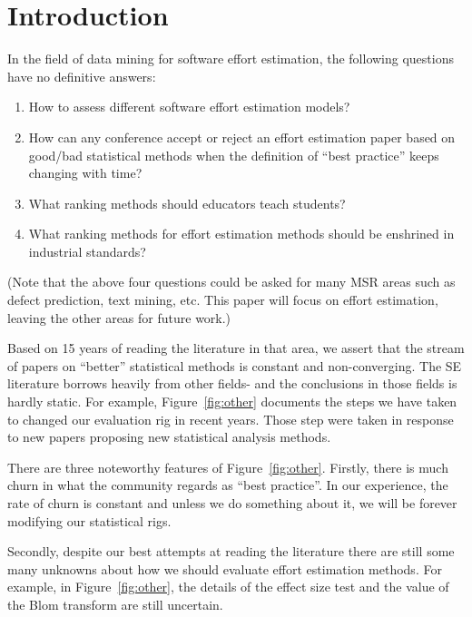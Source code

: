 \documentclass{sig-alternate}
\newcommand{\be}{\begin{enumerate}}
\newcommand{\ee}{\end{enumerate}}
\newcommand{\fig}[1]{Figure~\ref{fig:#1}}
\begin{document}
\section{Introduction}
\noindent
In the field of data mining for software effort estimation,
the following questions
have no definitive answers:
\be
\item
How to assess different software effort estimation
models?
\item  
 How can any conference accept or reject an
effort estimation paper based
on good/bad statistical methods when the
definition of  ``best
practice'' keeps changing with time? 
\item
What ranking methods
should educators teach  students?
\item
What ranking methods for effort estimation methods
should be enshrined in industrial standards? 
\ee
(Note that the above four questions could
be asked for many MSR areas such as defect prediction,
text mining, etc. This paper will
focus
on effort estimation, leaving the
other areas for future work.)

Based on 15 years of reading the literature
in that area, we assert that the stream of papers on
``better'' statistical methods is constant and
non-converging.  The SE literature
borrows heavily from other fields- and the
conclusions in those fields is hardly static.
For example, \fig{other} documents the
steps we have taken to
changed our evaluation rig in recent years.
Those step were taken in response to new
papers proposing new 
statistical analysis methods.

There are three noteworthy features of \fig{other}.
Firstly, there is much
churn in what the community regards
as ``best practice''. In our experience, the rate of churn
is constant and unless we do something about it,
we will be forever modifying our statistical rigs.

Secondly, despite our best attempts at reading the literature
there are still some many unknowns about how we should evaluate
effort estimation methods. For example, in \fig{other},
the details of the
effect size test and the value of the Blom transform are still
uncertain.
\end{document}
